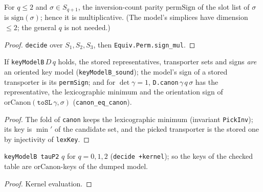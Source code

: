 \begin{theorem}\label{thm:permsign}
  \leanok
  For $q\le2$ and $\sigma\in S_{q+1}$, the inversion-count parity $\mathrm{permSign}$ of the slot list of $\sigma$ is
  $\mathrm{sign}(\sigma)$; hence it is multiplicative. (The model's simplices have dimension $\le2$; the general $q$ is not
  needed.)
\end{theorem}
\begin{proof}
  \leanok
  \texttt{decide} over $S_1,S_2,S_3$, then \texttt{Equiv.Perm.sign\_mul}.
\end{proof}

\begin{theorem}\label{thm:keymodel-tie}
  \leanok
  If \texttt{keyModelB}\,$D\,q$ holds, the stored representatives, transporter sets and signs \emph{are} an oriented key
  model (\texttt{keyModelB\_sound}); the model's sign of a stored transporter is its \texttt{permSign}; and for
  $\det\gamma=1$, \texttt{D.canon}\,$\gamma\,q\,\sigma$ has the representative, the lexicographic minimum and the orientation
  sign of $\mathrm{orCanon}(\mathtt{toSL}\,\gamma,\sigma)$ (\texttt{canon\_eq\_canon}).
\end{theorem}
\begin{proof}
  \leanok
  The fold of \texttt{canon} keeps the lexicographic minimum (invariant \texttt{PickInv}); its key is $\min'$ of the candidate
  set, and the picked transporter is the stored one by injectivity of \texttt{lexKey}.
\end{proof}

\begin{theorem}[The real $p=2$ dump is an oriented key model]\label{chk:tau-p2-key}
  \leanok
  \texttt{keyModelB tauP2} $q$ for $q=0,1,2$ (\texttt{decide +kernel}); so the keys of the checked table are
  $\mathrm{orCanon}$-keys of the dumped model.
\end{theorem}
\begin{proof}
  \leanok
  Kernel evaluation.
\end{proof}

